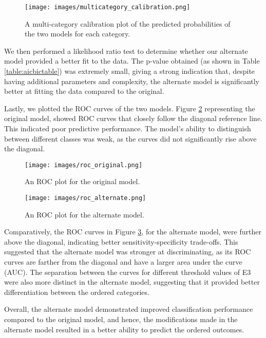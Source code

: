 \documentclass[titlepage]{article}
\begin{document}
\begin{figure}[H]
    \centering
    \texttt{[image: images/multicategory\_calibration.png]}
    \caption{A multi-category calibration plot of the predicted probabilities of the two models for each category.}
    \label{fig:calib_plot}
\end{figure}

\justify
We then performed a likelihood ratio test to determine whether our alternate model provided a better fit to the data. The p-value obtained (as shown in Table \ref{table:aicbictable}) was extremely small, giving a strong indication that, despite having additional parameters and complexity, the alternate model is significantly better at fitting the data compared to the original.

\justify
Lastly, we plotted the ROC curves of the two models. Figure \ref{fig:roc_orig} representing the original model, showed ROC curves that closely follow the diagonal reference line. This indicated poor predictive performance. The model’s ability to distinguish between different classes was weak, as the curves did not significantly rise above the diagonal.


\begin{figure}[H]
    \centering
    \texttt{[image: images/roc\_original.png]}
    \caption{An ROC plot for the original model.}
    \label{fig:roc_orig}
\end{figure}

\begin{figure}[H]
    \centering
    \texttt{[image: images/roc\_alternate.png]}
    \caption{An ROC plot for the alternate model.}
    \label{fig:roc_alter}
\end{figure}

\justify
Comparatively, the ROC curves in Figure \ref{fig:roc_alter}, for the alternate model, were further above the diagonal, indicating better sensitivity-specificity trade-offs. This suggested that the alternate model was stronger at discriminating, as its ROC curves are farther from the diagonal and have a larger area under the curve (AUC). The separation between the curves for different threshold values of E3 were also more distinct in the alternate model, suggesting that it provided better differentiation between the ordered categories.

\justify
Overall, the alternate model demonstrated improved classification performance compared to the original model, and hence, the modifications made in the alternate model resulted in a better ability to predict the ordered outcomes.
\end{document}
